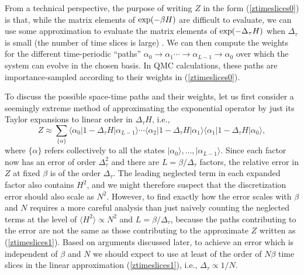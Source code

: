 \documentclass[draft,numberedheadings]{aipproc}
\begin{document}
From a technical perspective, the purpose of writing $Z$ in the form (\ref{ztimeslices0}) is that, while the matrix elements of ${\rm exp}{(-\beta H)}$ are 
difficult to evaluate, we can use some approximation to evaluate the matrix elements of ${\rm exp}{(-\Delta_\tau H)}$ when $\Delta_\tau$ is small (the number of 
time slices is large) . We can then compute the weights for the different time-periodic ``paths'' $\alpha_0 \to \alpha_1 \cdots \to \alpha_{L-1} \to \alpha_0$ 
over which the system can evolve in the chosen basis. In QMC calculations, these paths are importance-sampled according to their weights 
in (\ref{ztimeslices0}).

To discuss the possible space-time paths and their weights, let us first consider a seemingly extreme method of approximating the exponential operator 
by just its Taylor expansions to linear order in $\Delta_\tau H$, i.e.,
\begin{equation}
Z \approx \sum_{\{ \alpha \}}
\langle \alpha_0|1-\Delta_\tau H|\alpha_{L-1}\rangle \cdots
\langle \alpha_2|1-\Delta_\tau H|\alpha_1\rangle 
\langle \alpha_{1}|1-\Delta_\tau H|\alpha_0\rangle,
\label{ztimeslices1}
\end{equation}
where $\{\alpha\}$ refers collectively to all the states $|\alpha_0\rangle,\ldots,|\alpha_{L-1}\rangle$. Since each factor now has an error of order $\Delta_\tau^2$ 
and there are $L=\beta/\Delta_\tau$ factors, the relative error in $Z$ at fixed $\beta$ is of the order $\Delta_\tau$. The leading neglected term in each expanded 
factor also contains $H^2$, and we might therefore suspect that the discretization error should also scale as $N^2$. However, to find exactly how the error scales 
with $\beta$ and $N$ requires a more careful analysis than just naively counting the neglected terms at the level of $\langle H^2\rangle \propto N^2$ 
and $L=\beta/\Delta_\tau$, because the paths contributing to the error are not the same as those contributing to the approximate $Z$ written as (\ref{ztimeslices1}). 
Based on arguments discussed later, to achieve an error which is independent of $\beta$ and $N$ we should expect to use at least of the order of $N\beta$ time 
slices in the linear approximation (\ref{ztimeslices1}), i.e., $\Delta_\tau \propto 1/N$. 
\end{document}
